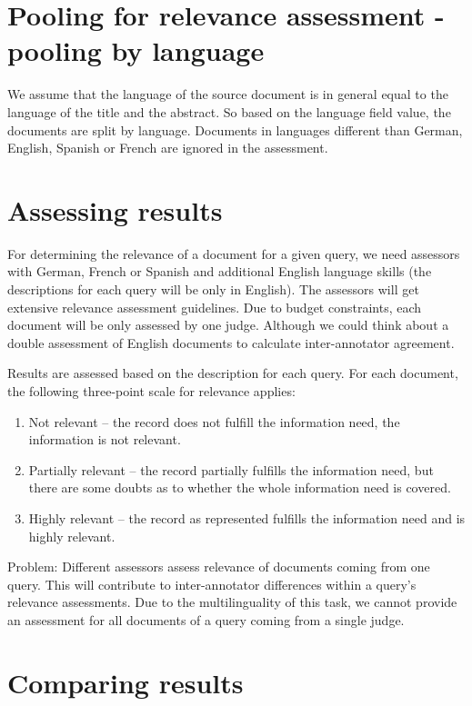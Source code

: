 \documentclass[a4paper,11pt]{article}
\begin{document}
\section{Pooling for relevance assessment - pooling by language}

We assume that the language of the source document is in general equal to the language of the title and the abstract. So based on the language field value, the documents are split by language.
Documents in languages different than German, English, Spanish or French are ignored in the assessment. 

\section{Assessing results}

For determining the relevance of a document for a given query, we need assessors with German, French or Spanish and additional English language skills (the descriptions for each query will be only in English). The assessors will get extensive relevance assessment guidelines. Due to budget constraints, each document will be only assessed by one judge. Although we could think about a double assessment of English documents to calculate inter-annotator agreement.

Results are assessed based on the description for each query. For each document, the following three-point scale for relevance applies:
\begin{enumerate}
\item Not relevant – the record does not fulfill the information need, the information is not relevant.
\item Partially relevant – the record partially fulfills the information need, but there are some doubts as to
whether the whole information need is covered.
\item Highly relevant – the record as represented fulfills the information need and is highly relevant.
\end{enumerate}

Problem: Different assessors assess relevance of documents coming from one query. This will contribute to inter-annotator differences within a query’s relevance assessments. Due to the multilinguality of this task, we cannot provide an assessment for all documents of a query coming from a single judge.

\section{Comparing results}
\end{document}
